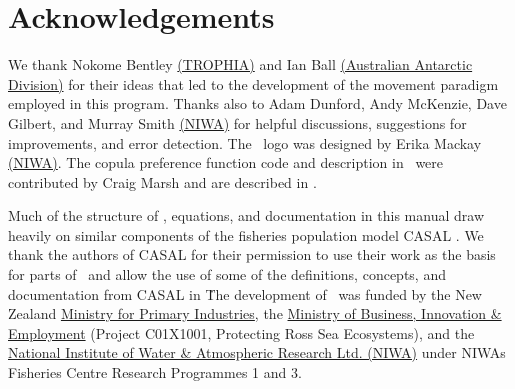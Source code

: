 \section{Acknowledgements\label{sec:acknowledgements}}

We thank Nokome Bentley \href{http://www.trophia.co.nz}{(TROPHIA)} and Ian Ball \href{http://www.aad.gov.au}{(Australian Antarctic Division)} for their ideas that led to the development of the movement paradigm employed in this program. Thanks also to Adam Dunford, Andy McKenzie, Dave Gilbert, and Murray Smith \href{http://www.niwa.co.nz}{(NIWA)} for helpful discussions, suggestions for improvements, and error detection. The \SPM\ logo was designed by Erika Mackay \href{http://www.niwa.co.nz}{(NIWA)}. The copula preference function code and description in \SPM\ were contributed by Craig Marsh and are described in \cite{Marsh2015}.

Much of the structure of \SPM, equations, and documentation in this manual draw heavily on similar components of the fisheries population model CASAL \citep{1388}. We thank the authors of CASAL for their permission to use their work as the basis for parts of \SPM\ and allow the use of some of the definitions, concepts, and documentation from CASAL in \SPM\. 

The development of \SPM\ was funded by the New Zealand \href{http://www.mpi.govt.nz}{Ministry for Primary Industries}, the \href{http://www.msi.govt.nz}{Ministry of Business, Innovation \& Employment} (Project C01X1001, Protecting Ross Sea Ecosystems), and the \href{http://www.niwa.co.nz}{National Institute of Water \& Atmospheric Research Ltd. (NIWA)} under NIWAs Fisheries Centre Research Programmes 1 and 3. 
